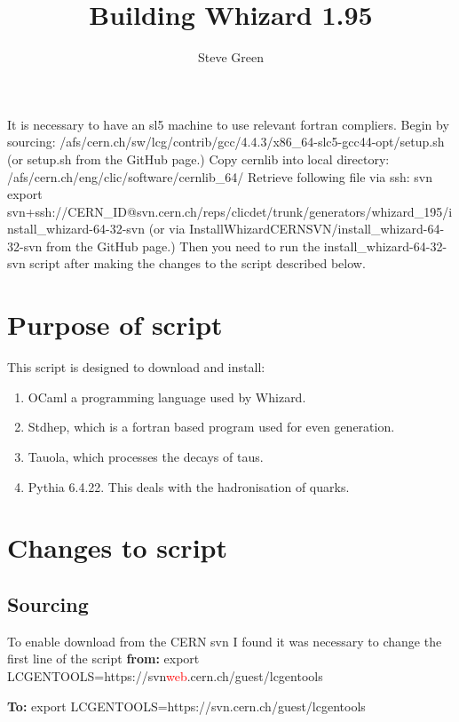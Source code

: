 \documentclass[11pt, oneside]{article}   	%
\title{Building Whizard 1.95}
\author{Steve Green}
\date{}							%
\begin{document}
\maketitle
It is necessary to have an sl5 machine to use relevant fortran compliers.
Begin by sourcing: /afs/cern.ch/sw/lcg/contrib/gcc/4.4.3/x86\_64-slc5-gcc44-opt/setup.sh (or setup.sh from the GitHub page.)
Copy cernlib into local directory: /afs/cern.ch/eng/clic/software/cernlib\_64/
Retrieve following file via ssh: svn export svn+ssh://CERN\_ID@svn.cern.ch/reps/clicdet/trunk/generators/whizard\_195/install\_whizard-64-32-svn (or via 	InstallWhizardCERNSVN/install\_whizard-64-32-svn from the GitHub page.)
Then you need to run the install\_whizard-64-32-svn script after making the changes to the script described below.

\section{Purpose of script}

This script is designed to download and install:
\begin{enumerate}
\item OCaml a programming language used by Whizard.
\item Stdhep, which is a fortran based program used for even generation.
\item Tauola, which processes the decays of taus.
\item Pythia 6.4.22.  This deals with the hadronisation of quarks.
\end{enumerate}

\section{Changes to script}
\subsection{Sourcing}
To enable download from the CERN svn I found it was necessary to change the first line of the script \textbf{from:} \newline
export LCGENTOOLS=https://svn\textcolor{red}{web}.cern.ch/guest/lcgentools \newline

\textbf{To:} \newline
export LCGENTOOLS=https://svn.cern.ch/guest/lcgentools \newline
\end{document}
